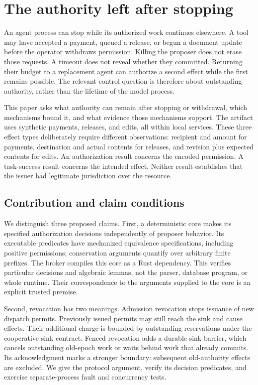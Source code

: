 \section{The authority left after stopping}
An agent process can stop while its authorized work continues elsewhere. A tool
may have accepted a payment, queued a release, or begun a document update before
the operator withdraws permission. Killing the proposer does not erase those
requests. A timeout does not reveal whether they committed. Returning their
budget to a replacement agent can authorize a second effect while the first
remains possible. The relevant control question is therefore about outstanding
authority, rather than the lifetime of the model process.

This paper asks what authority can remain after stopping or withdrawal, which
mechanisms bound it, and what evidence those mechanisms support. The artifact
uses synthetic payments, releases, and edits, all within local services. These
three effect types deliberately require different observations: recipient and
amount for payments, destination and actual contents for releases, and revision
plus expected contents for edits. An authorization result concerns the encoded
permission. A task-success result concerns the intended effect. Neither result
establishes that the issuer had legitimate jurisdiction over the resource.

\subsection{Contribution and claim conditions}
We distinguish three proposed claims. First, a deterministic core makes its
specified authorization decisions independently of proposer behavior. Its
executable predicates have mechanized equivalence specifications, including
positive permissions; conservation arguments quantify over arbitrary finite
prefixes. The broker compiles this core as a Rust dependency. This verifies
particular decisions and algebraic lemmas, not the parser, database program, or
whole runtime. Their correspondence to the arguments supplied to the core is
an explicit trusted premise.

Second, revocation has two meanings. Admission revocation stops issuance of new
dispatch permits. Previously issued permits may still reach the sink and cause
effects. Their additional charge is bounded by outstanding reservations under
the cooperative sink contract. Fenced revocation adds a durable sink barrier,
which cancels outstanding old-epoch work or waits behind work that already
commits. Its acknowledgment marks a stronger boundary: subsequent old-authority
effects are excluded. We give the protocol argument, verify its decision
predicates, and exercise separate-process fault and concurrency tests.

